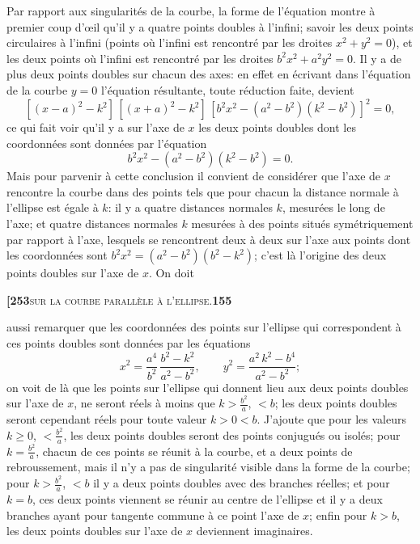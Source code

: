 \documentclass[11pt]{article}
\begin{document}
Par rapport aux singularités de la courbe, la forme de l'équation montre à premier coup d'\oe il qu'il y a quatre points doubles à l'infini; savoir les deux points circulaires à l'infini (points où l'infini est rencontré par les droites $x^2 + y^2 = 0$), et les deux points où l'infini est rencontré par les droites $b^2x^2 + a^2y^2 = 0$. Il y a de plus deux points doubles sur chacun des axes: en effet en écrivant dans l'équation de la courbe $y = 0$ l'équation résultante, toute réduction faite, devient
\[
[(x - a)^2 - k^2]\,[(x + a)^2 - k^2]\,[b^2x^2 - (a^2 - b^2)(k^2 - b^2)]^2 = 0,
\]
ce qui fait voir qu'il y a sur l'axe de $x$ les deux points doubles dont les coordonnées sont données par l'équation
\[
b^2x^2 - (a^2 - b^2)(k^2 - b^2) = 0.
\]
Mais pour parvenir à cette conclusion il convient de considérer que l'axe de $x$ rencontre la courbe dans des points tels que pour chacun la distance normale à l'ellipse est égale à $k$: il y a quatre distances normales $k$, mesurées le long de l'axe; et quatre distances normales $k$ mesurées à des points situés symétriquement par rapport à l'axe, lesquels se rencontrent deux à deux sur l'axe aux points dont les coordonnées sont $b^2x^2 = (a^2 - b^2)(b^2 - k^2)$; c'est là l'origine des deux points doubles sur l'axe de $x$. On doit

\newpage

\noindent\textbf{[253}\hfill\textsc{sur la courbe parallèle à l'ellipse.}\hfill\textbf{155}

\medskip

\noindent aussi remarquer que les coordonnées des points sur l'ellipse qui correspondent à ces points doubles sont données par les équations
\[
x^2 = \frac{a^4}{b^2}\,\frac{b^2 - k^2}{a^2 - b^2},\qquad y^2 = \frac{a^2\,k^2 - b^4}{a^2 - b^2};
\]
on voit de là que les points sur l'ellipse qui donnent lieu aux deux points doubles sur l'axe de $x$, ne seront réels à moins que $k > \tfrac{b^2}{a}$, $<b$; les deux points doubles seront cependant réels pour toute valeur $k > 0 < b$. J'ajoute que pour les valeurs $k \geq 0$, $<\tfrac{b^2}{a}$, les deux points doubles seront des points conjugués ou isolés; pour $k = \tfrac{b^2}{a}$, chacun de ces points se réunit à la courbe, et a deux points de rebroussement, mais il n'y a pas de singularité visible dans la forme de la courbe; pour $k > \tfrac{b^2}{a}$, $<b$ il y a deux points doubles avec des branches réelles; et pour $k = b$, ces deux points viennent se réunir au centre de l'ellipse et il y a deux branches ayant pour tangente commune à ce point l'axe de $x$; enfin pour $k > b$, les deux points doubles sur l'axe de $x$ deviennent imaginaires.
\end{document}
